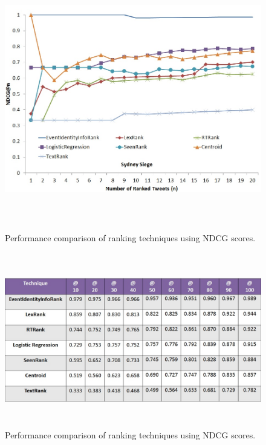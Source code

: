 \begin{figure}[htbp]
\centering
\includegraphics[height=4.5in,width=6in]{Figures/EventIdentityInfoRankPerformanceSydneySiege.jpg}
\caption{\small Performance comparison of ranking techniques using NDCG scores.}
\label{sydneysiegendcg}
\end{figure}






\begin{figure}[htbp]
\centering
\includegraphics[height=3in,width=5.5in]{Figures/MillionsMarchNycCorrectedNDCG.jpg}
\caption{Performance comparison of ranking techniques using NDCG scores.}
\label{millionsmarchndcgtable}
\end{figure}

